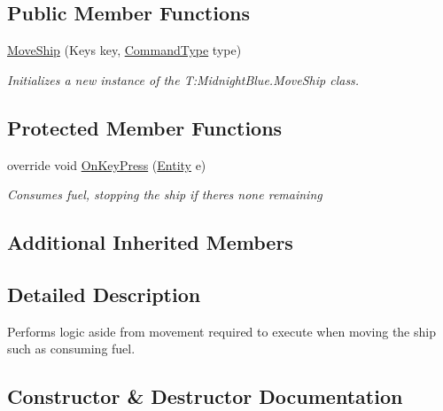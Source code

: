 \subsection*{Public Member Functions}
\begin{DoxyCompactItemize}
\item 
\hyperlink{class_midnight_blue_1_1_move_ship_a7c3de7f43d19cde694040c71a5ee5fa0}{Move\+Ship} (Keys key, \hyperlink{namespace_m_b2_d_1_1_i_o_ab5f95f3fe9e652778b62bdf943168a68}{Command\+Type} type)
\begin{DoxyCompactList}\small\item\em Initializes a new instance of the T\+:\+Midnight\+Blue.\+Move\+Ship class. \end{DoxyCompactList}\end{DoxyCompactItemize}
\subsection*{Protected Member Functions}
\begin{DoxyCompactItemize}
\item 
override void \hyperlink{class_midnight_blue_1_1_move_ship_ac4b3dcb62954548f27bad5e5d6a00cdf}{On\+Key\+Press} (\hyperlink{class_m_b2_d_1_1_entity_component_1_1_entity}{Entity} e)
\begin{DoxyCompactList}\small\item\em Consumes fuel, stopping the ship if there\textquotesingle{}s none remaining \end{DoxyCompactList}\end{DoxyCompactItemize}
\subsection*{Additional Inherited Members}


\subsection{Detailed Description}
Performs logic aside from movement required to execute when moving the ship such as consuming fuel. 



\subsection{Constructor \& Destructor Documentation}
\hypertarget{class_midnight_blue_1_1_move_ship_a7c3de7f43d19cde694040c71a5ee5fa0}{}\label{class_midnight_blue_1_1_move_ship_a7c3de7f43d19cde694040c71a5ee5fa0} 
